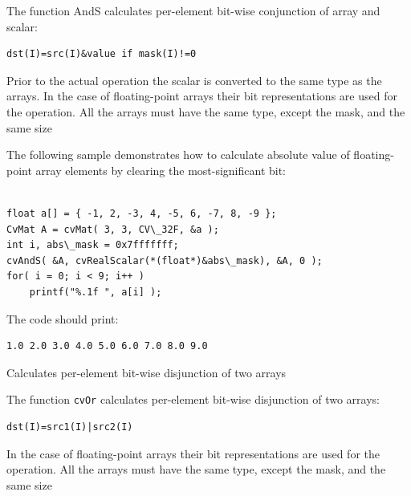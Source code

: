 The function AndS calculates per-element bit-wise conjunction of array and scalar:

\begin{lstlisting}
dst(I)=src(I)&value if mask(I)!=0
\end{lstlisting}

Prior to the actual operation the scalar is converted to the same type as the arrays. In the case of floating-point arrays their bit representations are used for the operation. All the arrays must have the same type, except the mask, and the same size

The following sample demonstrates how to calculate absolute value of floating-point array elements by clearing the most-significant bit:

\begin{lstlisting}

float a[] = { -1, 2, -3, 4, -5, 6, -7, 8, -9 };
CvMat A = cvMat( 3, 3, CV\_32F, &a );
int i, abs\_mask = 0x7fffffff;
cvAndS( &A, cvRealScalar(*(float*)&abs\_mask), &A, 0 );
for( i = 0; i < 9; i++ )
    printf("%.1f ", a[i] );

\end{lstlisting}

The code should print:

\begin{lstlisting}
1.0 2.0 3.0 4.0 5.0 6.0 7.0 8.0 9.0
\end{lstlisting}


\label{Or}

Calculates per-element bit-wise disjunction of two arrays


\begin{description}
\end{description}


The function \texttt{cvOr} calculates per-element bit-wise disjunction of two arrays:

\begin{lstlisting}
dst(I)=src1(I)|src2(I)
\end{lstlisting}

In the case of floating-point arrays their bit representations are used for the operation. All the arrays must have the same type, except the mask, and the same size

